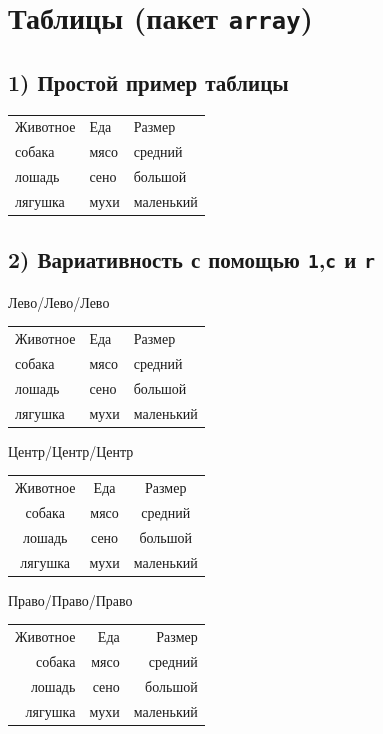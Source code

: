 \documentclass{article}
\begin{document}
\section*{Таблицы (пакет \texttt{array})}

\subsection*{1) Простой пример таблицы}

\begin{tabular}{lll}
Животное & Еда  & Размер \\
собака   & мясо & средний \\
лошадь   & сено & большой \\
лягушка  & мухи & маленький \\
\end{tabular}

\bigskip

\subsection*{2) Вариативность с помощью \texttt{1},\texttt{c} и \texttt{r}}

\noindent Лево/Лево/Лево
\begin{tabular}{lll}
Животное & Еда  & Размер \\
собака   & мясо & средний \\
лошадь   & сено & большой \\
лягушка  & мухи & маленький \\
\end{tabular}

\medskip
\noindent Центр/Центр/Центр
\begin{tabular}{ccc}
Животное & Еда  & Размер \\
собака   & мясо & средний \\
лошадь   & сено & большой \\
лягушка  & мухи & маленький \\
\end{tabular}

\medskip
\noindent Право/Право/Право
\begin{tabular}{rrr}
Животное & Еда  & Размер \\
собака   & мясо & средний \\
лошадь   & сено & большой \\
лягушка  & мухи & маленький \\
\end{tabular}
\end{document}
